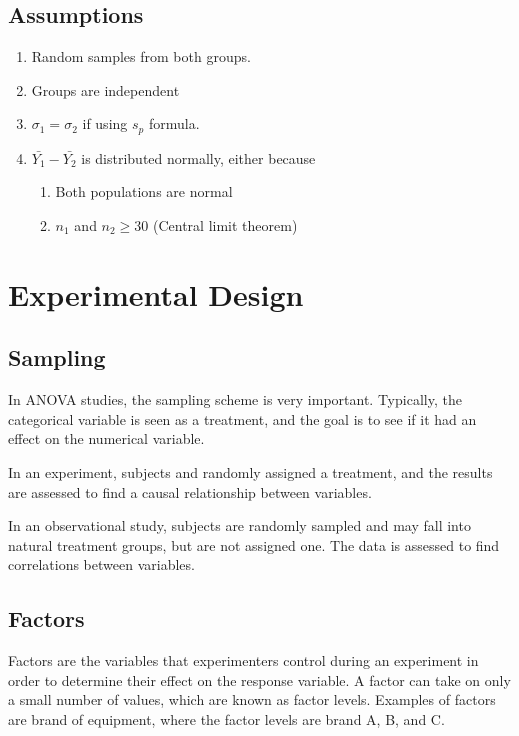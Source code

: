\documentclass[10pt]{article}
\newcommand{\define}[1]{\colorbox{Thistle2}{#1}}
\newcommand{\emphas}[1]{\colorbox{DarkSeaGreen2}{#1}}
\newcommand{\sigdev}[1]{\sigma_{#1}}
\begin{document}
\begin{multicols}{3}
    \subsection{Assumptions}
    \begin{enumerate}
        \item Random samples from both groups.
        \item Groups are independent
        \item $\sigdev{1} = \sigdev{2}$ if using $s_p$ formula.
        \item $\bar{Y_1} - \bar{Y_2}$ is distributed normally, either because
              \begin{enumerate}
                  \item Both populations are normal
                  \item $n_1$ and $n_2 \geq 30$ (Central limit theorem)
              \end{enumerate}
    \end{enumerate}

    \section{Experimental Design}

    \subsection{Sampling}

    In ANOVA studies, the sampling scheme is very important. Typically, the \emphas{categorical variable} is seen as a \emphas{treatment}, and the goal is to see if it had an effect on the numerical variable.

    In an \define{experiment}, subjects and randomly assigned a \emphas{treatment}, and the results are assessed to find a causal relationship between variables.

    In an \define{observational study}, subjects are randomly sampled and may fall into natural \emphas{treatment groups}, but are not assigned one. The data is assessed to find \emphas{correlations} between variables.

    \subsection{Factors}

    \define{Factors} are the variables that experimenters control during an experiment in order to determine their effect on the response variable. A factor can take on only a small number of values, which are known as factor levels. Examples of factors are brand of equipment, where the factor levels are brand A, B, and C.


\end{multicols}
\end{document}
